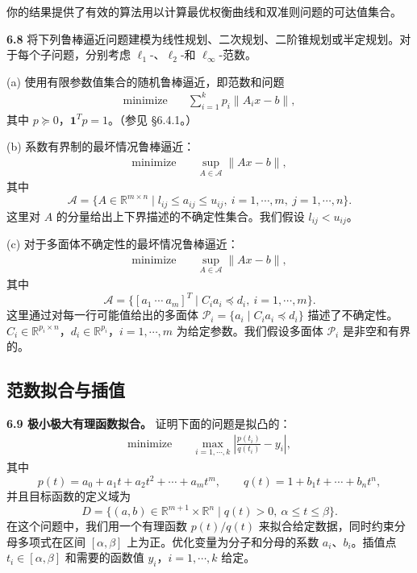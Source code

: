 \documentclass[UTF8,12pt,a4paper,fontset=fandol]{ctexart}
\begin{document}
你的结果提供了有效的算法用以计算最优权衡曲线和双准则问题的可达值集合。

\noindent\textbf{6.8}\quad
将下列鲁棒逼近问题建模为线性规划、二次规划、二阶锥规划或半定规划。对于每个子问题，分别考虑 $\ell_1$-、$\ell_2$-和 $\ell_\infty$-范数。

(a) 使用有限参数值集合的随机鲁棒逼近，即范数和问题
\[
\begin{aligned}
\text{minimize}\quad & \sum_{i=1}^k p_i\|A_ix-b\|,
\end{aligned}
\]
其中 $p\succeq 0$，$\mathbf{1}^Tp=1$。（参见 \S6.4.1。）

(b) 系数有界制的最坏情况鲁棒逼近：
\[
\begin{aligned}
\text{minimize}\quad & \sup_{A\in\mathcal{A}}\|Ax-b\|,
\end{aligned}
\]
其中
\[
\mathcal{A}=\{A\in\mathbb{R}^{m\times n}\mid l_{ij}\leq a_{ij}\leq u_{ij},\ i=1,\cdots,m,\ j=1,\cdots,n\}.
\]
这里对 $A$ 的分量给出上下界描述的不确定性集合。我们假设 $l_{ij}<u_{ij}$。

(c) 对于多面体不确定性的最坏情况鲁棒逼近：
\[
\begin{aligned}
\text{minimize}\quad & \sup_{A\in\mathcal{A}}\|Ax-b\|,
\end{aligned}
\]
其中
\[
\mathcal{A}=\{[a_1\ \cdots\ a_m]^T\mid C_i a_i\preceq d_i,\ i=1,\cdots,m\}.
\]
这里通过对每一行可能值给出的多面体 $\mathcal{P}_i=\{a_i\mid C_i a_i\preceq d_i\}$ 描述了不确定性。$C_i\in\mathbb{R}^{p_i\times n}$，$d_i\in\mathbb{R}^{p_i}$，$i=1,\cdots,m$ 为给定参数。我们假设多面体 $\mathcal{P}_i$ 是非空和有界的。

\subsection*{范数拟合与插值}

\noindent\textbf{6.9 极小极大有理函数拟合。}\quad
证明下面的问题是拟凸的：
\[
\begin{aligned}
\text{minimize}\quad & \max_{i=1,\cdots,k}\left|\frac{p(t_i)}{q(t_i)}-y_i\right|,
\end{aligned}
\]
其中
\[
p(t)=a_0+a_1t+a_2t^2+\cdots+a_mt^m,\qquad
q(t)=1+b_1t+\cdots+b_nt^n,
\]
并且目标函数的定义域为
\[
D=\{(a,b)\in\mathbb{R}^{m+1}\times\mathbb{R}^n\mid q(t)>0,\ \alpha\leq t\leq\beta\}.
\]
在这个问题中，我们用一个有理函数 $p(t)/q(t)$ 来拟合给定数据，同时约束分母多项式在区间 $[\alpha,\beta]$ 上为正。优化变量为分子和分母的系数 $a_i$、$b_i$。插值点 $t_i\in[\alpha,\beta]$ 和需要的函数值 $y_i$，$i=1,\cdots,k$ 给定。
\end{document}
